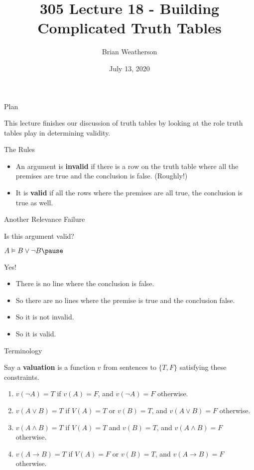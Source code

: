 \documentclass[
  ignorenonframetext,
]{beamer}
\title{305 Lecture 18 - Building Complicated Truth Tables}
\author{Brian Weatherson}
\date{July 13, 2020}
\providecommand{\tightlist}{%
  \setlength{\itemsep}{0pt}\setlength{\parskip}{0pt}}
\renewcommand{\,}{\text{, }}
\renewenvironment*{quote}	
	{\list{}{\rightmargin   \leftmargin} \item } 	
	{\endlist }
\begin{document}
\frame{\titlepage}

\begin{frame}{Plan}
\protect\hypertarget{plan}{}

This lecture finishes our discussion of truth tables by looking at the
role truth tables play in determining validity.

\end{frame}

\begin{frame}{The Rules}
\protect\hypertarget{the-rules}{}

\begin{itemize}
\tightlist
\item
  An argument is \textbf{invalid} if there is a row on the truth table
  where all the premises are true and the conclusion is false.
  (Roughly!)
\item
  It is \textbf{valid} if all the rows where the premises are all true,
  the conclusion is true as well.
\end{itemize}

\end{frame}

\begin{frame}{Another Relevance Failure}
\protect\hypertarget{another-relevance-failure}{}

Is this argument valid?

\begin{quote}
\(A \vDash B \vee \neg B \pause\)
\end{quote}

Yes!

\begin{itemize}
\tightlist
\item
  There is no line where the conclusion is false.
\item
  So there are no lines where the premise is true and the conclusion
  false.
\item
  So it is not invalid.
\item
  So it is valid.
\end{itemize}

\end{frame}

\begin{frame}{Terminology}
\protect\hypertarget{terminology}{}

Say a \textbf{valuation} is a function \(v\) from sentences to
\(\{T, F\}\) satisfying these constraints.

\begin{enumerate}
\tightlist
\item
  \(v(\neg A) = T\) if \(v(A) = F\), and \(v(\neg A) = F\) otherwise.
\item
  \(v(A \vee B) = T\) if \(V(A) = T\) or \(v(B) = T\), and
  \(v(A \vee B) = F\) otherwise.
\item
  \(v(A \wedge B) = T\) if \(V(A) = T\) and \(v(B) = T\), and
  \(v(A \wedge B) = F\) otherwise.
\item
  \(v(A \rightarrow B) = T\) if \(V(A) = F\) or \(v(B) = T\), and
  \(v(A \rightarrow B) = F\) otherwise.
\end{enumerate}

\end{frame}
\end{document}
